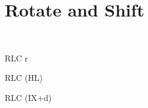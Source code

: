 \section{Rotate and Shift}

\begin{minipage}{\textwidth}
	
\begin{instrtable}
    \\[-10pt]

    \begin{instruction}{RLC r}
            \FlagsRLCr
        \SkipToOpCode 
    \end{instruction}

    \begin{instruction}{RLC (HL)}
            \FlagsRLCr
        \SkipToOpCode 
    \end{instruction}

    \begin{instruction}{RLC (IX+d)}
            \FlagsRLCr
        \SkipToOpCode 
        \SkipToOpCode 
        \SkipToOpCode 
    \end{instruction}


\end{instrtable}
\end{minipage}
